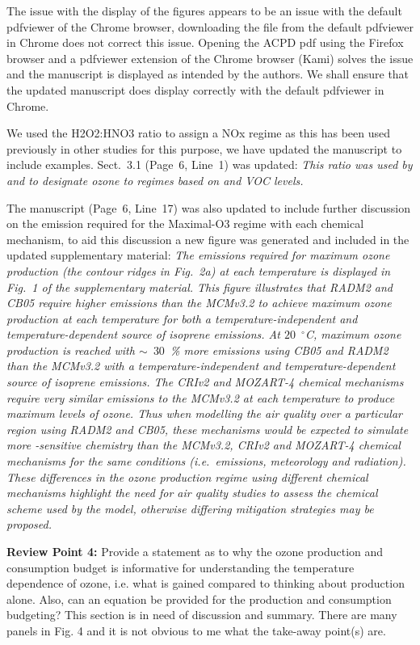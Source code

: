\documentclass{article}
\DeclareRobustCommand*\degree{\ensuremath{^{\circ}}}
\begin{document}
The issue with the display of the figures appears to be an issue with the default pdfviewer of the Chrome browser, downloading the file from the default pdfviewer in Chrome does not correct this issue. Opening the ACPD pdf using the Firefox browser and a pdfviewer extension of the Chrome browser (Kami) solves the issue and the manuscript is displayed as intended by the authors. We shall ensure that the updated manuscript does display correctly with the default pdfviewer in Chrome.

We used the H2O2:HNO3 ratio to assign a NOx regime as this has been used previously in other studies for this purpose, we have updated the manuscript to include examples. Sect.~3.1 (Page~6, Line~1) was updated:
\textit{
This ratio was used by \citet{Sillman:1995} and \citet{Staffelbach:1997} to designate ozone to  regimes based on  and VOC levels. 
}

The manuscript (Page~6, Line~17) was also updated to include further discussion on the  emission required for the Maximal-O3 regime with each chemical mechanism, to aid this discussion a new figure was generated and included in the updated supplementary material:
\textit{
The  emissions required for maximum ozone production (the contour ridges in Fig.~2a) at each temperature is displayed in Fig.~1 of the supplementary material.
This figure illustrates that RADM2 and CB05 require higher  emissions than the MCMv3.2 to achieve maximum ozone production at each temperature for both a temperature-independent and temperature-dependent source of isoprene emissions.
At $20$~\degree C, maximum ozone production is reached with $\sim$~$30$~\% more  emissions using CB05 and RADM2 than the MCMv3.2 with a temperature-independent and temperature-dependent source of isoprene emissions.
The CRIv2 and MOZART-4 chemical mechanisms require very similar  emissions to the MCMv3.2 at each temperature to produce maximum levels of ozone.
Thus when modelling the air quality over a particular region using RADM2 and CB05, these mechanisms would be expected to simulate more -sensitive chemistry than the MCMv3.2, CRIv2 and MOZART-4 chemical mechanisms for the same conditions (i.e.~emissions, meteorology and radiation).
These differences in the ozone production regime using different chemical mechanisms highlight the need for air quality studies to assess the chemical scheme used by the model, otherwise differing mitigation strategies may be proposed.
}

\textbf{Review Point 4:}  Provide a statement as to why the ozone production and consumption budget is informative for understanding the temperature dependence of ozone, i.e.  what is gained compared to thinking about production alone. Also, can an equation be provided for the production and consumption budgeting? This section is in need of discussion and summary. There are many panels in Fig. 4 and it is not obvious to me what the take-away point(s) are.
\end{document}
